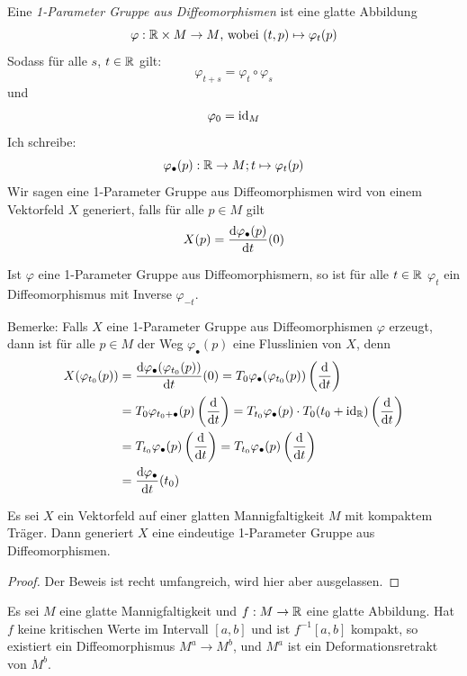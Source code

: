 \begin{definition}
    Eine \textit{1-Parameter Gruppe aus Diffeomorphismen} ist eine glatte 
    Abbildung
    \[ \varphi: \R \times M \to M \text{, wobei } (t, p) \mapsto \varphi_t(p) \]
    Sodass für alle $s$, $t \in \R$ gilt:
    \[ \varphi_{t + s} = \varphi_t \circ \varphi_s \]
    und 
    \[ \varphi_0 = \id_M \]
    Ich schreibe:
    \[ \varphi_{\bullet}(p): \R \to M ; t \mapsto \varphi_t(p) \]
    Wir sagen eine 1-Parameter Gruppe aus Diffeomorphismen wird von einem
    Vektorfeld $X$ generiert, falls für alle $p \in M$ gilt
    \[ X(p) = \derive[\varphi_{\bullet}(p)]{t}(0) \]
\end{definition}

Ist $\varphi$ eine 1-Parameter Gruppe aus Diffeomorphismern, so ist für alle 
$t \in \R$ $\varphi_t$ ein Diffeomorphismus mit Inverse $\varphi_{-t}$.

Bemerke: Falls $X$ eine 1-Parameter Gruppe aus Diffeomorphismen $\varphi$ erzeugt,
dann ist für alle $p \in M$ der Weg $\varphi_{\bullet}(p)$ eine Flusslinien von $X$, denn
\begin{align*}
    X(\varphi_{t_0}(p)) 
    & = \derive[\varphi_{\bullet}(\varphi_{t_0}(p))]{t}(0)
    = T_0 \varphi_{\bullet}(\varphi_{t_0}(p)) \left(\derive{t}\right) \\
    & = T_0 \varphi_{t_0 + \bullet}(p) \left(\derive{t}\right)
    = T_{t_0} \varphi_{\bullet}(p) \cdot T_0 (t_0 + \id_{\R}) \left(\derive{t}\right) \\
    & = T_{t_0} \varphi_{\bullet}(p) \left(\derive{t}\right)
    = T_{t_0} \varphi_{\bullet}(p) \left(\derive{t}\right) \\
    & = \derive[\varphi_{\bullet}]{t}(t_0)
\end{align*}

\begin{lemma}
    \label{lemma:generierende vektorfelder}
    Es sei $X$ ein Vektorfeld auf einer glatten Mannigfaltigkeit $M$ mit kompaktem 
    Träger. Dann generiert $X$ eine eindeutige 1-Parameter Gruppe aus 
    Diffeomorphismen.
\end{lemma}

\begin{proof} Der Beweis ist recht umfangreich, wird hier aber ausgelassen. \end{proof}

\begin{theorem}
    \label{theorem:erstes deformationslemma}
    Es sei $M$ eine glatte Mannigfaltigkeit und $f: M \rightarrow \R$ eine
    glatte Abbildung. Hat $f$ keine kritischen Werte im Intervall $[a, b]$ und 
    ist $f^{-1}[a, b]$ kompakt, so existiert ein Diffeomorphismus 
    $M^a \rightarrow M^b$, und $M^a$ ist ein Deformationsretrakt von $M^b$.
\end{theorem}

